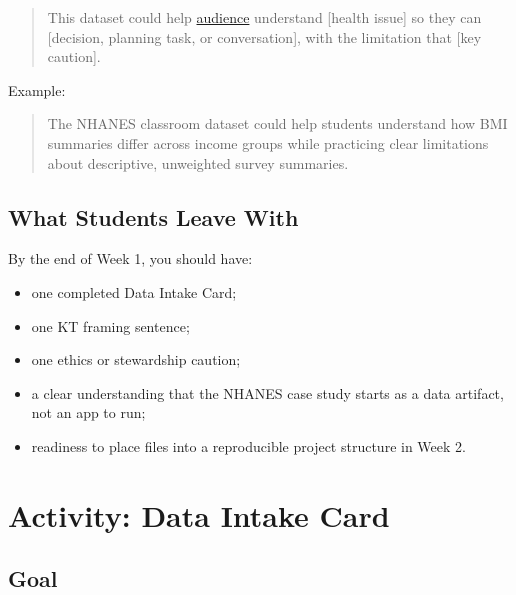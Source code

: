\documentclass[
  letterpaper,
  DIV=11,
  numbers=noendperiod,
  oneside]{scrreprt}
\providecommand{\tightlist}{%
  \setlength{\itemsep}{0pt}\setlength{\parskip}{0pt}}
\begin{document}
\begin{quote}
This dataset could help \hyperref[audience]{audience} understand
{[}health issue{]} so they can {[}decision, planning task, or
conversation{]}, with the limitation that {[}key caution{]}.
\end{quote}

Example:

\begin{quote}
The NHANES classroom dataset could help students understand how BMI
summaries differ across income groups while practicing clear limitations
about descriptive, unweighted survey summaries.
\end{quote}

\section*{What Students Leave With}\label{what-students-leave-with}


By the end of Week 1, you should have:

\begin{itemize}
\tightlist
\item
  one completed Data Intake Card;
\item
  one KT framing sentence;
\item
  one ethics or stewardship caution;
\item
  a clear understanding that the NHANES case study starts as a data
  artifact, not an app to run;
\item
  readiness to place files into a reproducible project structure in Week
  2.
\end{itemize}

\chapter*{Activity: Data Intake Card}\label{activity-data-intake-card}


\section*{Goal}\label{goal}

\end{document}
